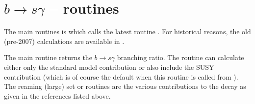 
\section{$b \rightarrow s \gamma$ -- routines}

The main routines is  which calls the latest
routine . For historical reasons, the old (pre-2007)
calculations are available in .

The main routine  returns the $b
\rightarrow s \gamma$ branching ratio. The routine can calculate
either only the standard model contribution or also include the SUSY
contribution (which is of course the default when this routine is
called from ). The reaming (large) set or routines are
the various contributions to the decay as given in the references
listed above.
